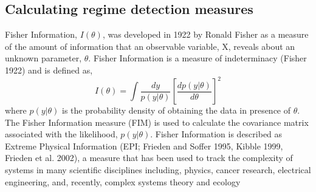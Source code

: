 \documentclass[12pt,twoside,openany]{reedthesis}
\begin{document}
\subsection{Calculating regime detection
measures}\label{calculating-regime-detection-measures}

Fisher Information, \(I(\theta)\), was developed in 1922 by Ronald
Fisher as a measure of the amount of information that an observable
variable, X, reveals about an unknown parameter, \(\theta\). Fisher
Information is a measure of indeterminacy (Fisher 1922) and is defined
as,
\begin{equation} 
I(\theta) = \int \frac{dy}{p(y|\theta)}\left[\frac{dp(y|\theta)}{d\theta}\right]^2
\label{eq:fiGeneral1922}
\end{equation}
where \(p(y|\theta)\) is the probability density of obtaining the data
in presence of \(\theta\). The Fisher Information measure (FIM) is used
to calculate the covariance matrix associated with the likelihood,
\(p(y|\theta)\). Fisher Information is described as Extreme Physical
Information (EPI; Frieden and Soffer 1995, Kibble 1999, Frieden et al.
2002), a measure that has been used to track the complexity of systems
in many scientific disciplines including, physics, cancer research,
electrical engineering, and, recently, complex systems theory and
ecology
\end{document}
